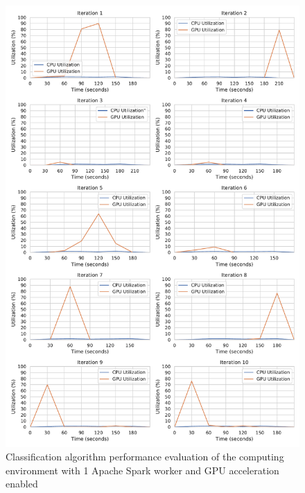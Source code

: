 \begin{figure}[h]
\centering
\includegraphics[scale=0.4]{images/07_evaluation/taxi/taxi_gpu1_performance}
\caption{Classification algorithm performance evaluation of the computing environment with 1 Apache Spark worker and GPU acceleration enabled}
\label{fig:07_mortgage_static-cpu_results}
\end{figure}

